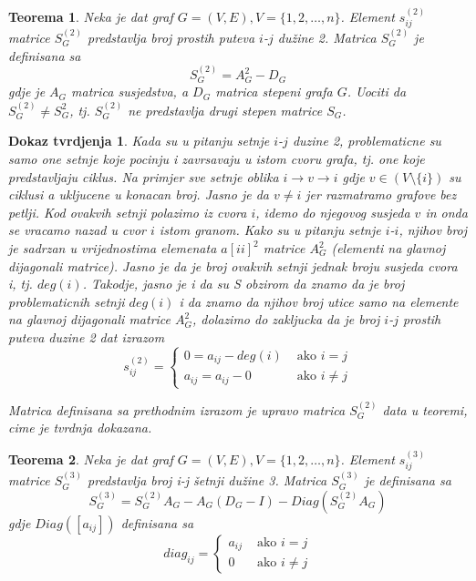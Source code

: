 \documentclass[11pt]{article}
\newtheorem{theorem}{Teorema}
\newtheorem*{custom_proof}{Dokaz tvrdjenja}
\begin{document}
			\begin{theorem}
			Neka je dat graf $G = (V, E), V = \{1, 2, \dots, n\}$. Element $s_{ij}^{(2)}$ matrice $S_G^{(2)}$ predstavlja broj prostih puteva $i$-$j$ dužine 2. Matrica $S_G^{(2)}$ je definisana sa
			\[
			S_G^{(2)} = A_G^{2} - D_G
			\]  
			gdje je $A_G$ matrica susjedstva, a $D_G$ matrica stepeni grafa $G$.
			Uociti da $S_G^{(2)} \neq S_G^{2}$, tj. $S_G^{(2)}$ ne predstavlja drugi stepen matrice $S_G$.
			\end{theorem}
		
			\begin{custom_proof}
			Kada su u pitanju setnje $i$-$j$ duzine 2, problematicne su samo one setnje koje pocinju i zavrsavaju u istom cvoru grafa, tj. one koje predstavljaju ciklus. 
		 	Na primjer sve setnje oblika $i \rightarrow v \rightarrow i$ gdje $v \in (V \setminus \{i\})$ su ciklusi a ukljucene u konacan broj. Jasno je da $v \neq i$ jer razmatramo grafove bez petlji. 
			Kod ovakvih setnji polazimo iz cvora $i$, idemo do njegovog susjeda $v$ in onda se vracamo nazad u cvor $i$ istom granom.
			Kako su u pitanju setnje $i$-$i$, njihov broj je sadrzan u vrijednostima elemenata $a[ii]^2$ matrice $A_G^2$ (elementi na glavnoj dijagonali matrice). 
			Jasno je da je broj ovakvih setnji jednak broju susjeda cvora i, tj. $deg(i)$. Takodje, jasno je i da su  
			S obzirom da znamo da je broj problematicnih setnji $deg(i)$ i da znamo da njihov broj utice samo na elemente na glavnoj dijagonali matrice $A_G^2$, 
			dolazimo do zakljucka da je broj $i$-$j$ prostih puteva duzine 2 dat izrazom
				\[
				s_{ij}^{(2)} = 
				 \begin{cases}
				 0 = a_{ij} - deg(i) &  \text{ ako } i =j  \\ 
				 a_{ij} = a_{ij} - 0   & \text{ ako } i \neq j 
				 \end{cases}
				\]  
		
			Matrica definisana sa prethodnim izrazom je upravo matrica $S_G^{(2)}$ data u teoremi, cime je tvrdnja dokazana.
			\end{custom_proof}
	
			\begin{theorem}
			Neka je dat graf $G = (V, E), V = \{1, 2, \dots, n\}$. Element $s_{ij}^{(3)}$ matrice $S_G^{(3)}$ predstavlja broj i-j šetnji dužine 3. Matrica $S_G^{(3)}$ je definisana sa
			\[
			S_G^{(3)} = S_G^{(2)} A_G - A_G(D_G - I) - Diag(S_G^{(2)}A_G) 
			\]  
			gdje $Diag([a_{ij}]) $ definisana sa
			\[
			diag_{ij} = 
			 \begin{cases}
			a_{ij} &  \text{ ako } i = j  \\ 
			 0   & \text{ ako } i \neq j 
			 \end{cases}
			\]
			\end{theorem}
	
\end{document}
